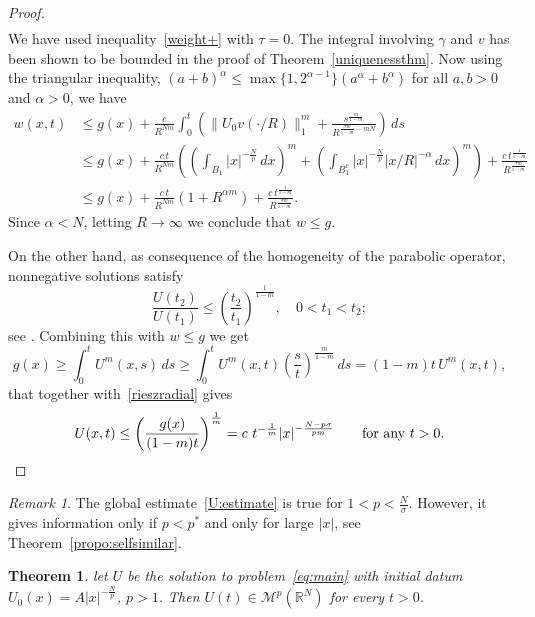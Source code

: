 \documentclass[leqno,12pt]{amsart}
\newtheorem{theorem}{Theorem}[section]
\theoremstyle{definition}
\theoremstyle{remark}
\newtheorem{remark}{Remark}
\numberwithin{equation}{section}
\begin{document}
\begin{proof}
\begin{align*}
\end{align*}
We have used inequality~\eqref{weight+} with $\tau=0$. The integral involving $\gamma$ and $v$ has been shown to be bounded in the proof of Theorem~\ref{uniquenessthm}. Now using the triangular inequality, $(a+b)^\alpha\leq \max\{1,2^{\alpha-1}\}(a^\alpha+b^\alpha)$ for all $a,b>0$ and $\alpha>0$, we have
\begin{align*}
    w(x,t)&\leq g(x) + \frac{c}{R^{Nm}}\int_0^t \left( \|U_0 v(\cdot/R)\|_{1}^{m} + \frac{s^{\tfrac{m}{1-m}}}{R^{\tfrac{\sigma m}{1-m}-mN}}\right) \, ds\\&
    \leq g(x)+\frac{c\,t}{R^{Nm}} \left(\left(\int_{B_1}|x|^{-\frac Np}\,dx\right)^m+\left(\int_{B_1^c}|x|^{-\frac Np}|x/R|^{-\alpha}\,dx\right)^m \right)+ \frac{c\,t^{\tfrac{1}{1-m}}}{R^{\tfrac{\sigma m}{1-m}}}\\&
    \leq g(x)+\frac{c\,t}{R^{Nm}}\left(1+R^{\alpha m}\right)+\frac{c\, t^{\tfrac{1}{1-m}}}{R^{\tfrac{\sigma m}{1-m}}}.
\end{align*}
Since $\alpha<N$, letting $R\to\infty$  we conclude that $w \leq g$. 

On the other hand, as consequence of the homogeneity of the parabolic operator, nonnegative solutions satisfy
$$
    \frac{U(t_2)}{U(t_1)}\leq \left(\frac{t_2}{t_1}\right)^{\frac{1}{1-m}},\quad 0<t_1<t_2; 
$$
see \cite{benilan-crandall}. Combining this with $w\leq g$ we get 
\begin{equation*}
    g(x)\ge \int_{0}^{t}U^m(x,s)\,ds\ge  \int_{0}^{t}U^m(x,t)\left(\frac{s}{t}\right)^{\frac{m}{1-m}}\,ds=(1-m)t\,U^m(x,t),
\end{equation*}
that together with~\eqref{rieszradial} gives
\begin{equation*}
    U(x,t)\le \left(\frac{g(x)}{(1-m)t}\right)^{\frac{1}{m}}=c \ t^{-\frac 1 m}|x|^{-\frac{N-p\sigma}{pm}}\qquad \text{for any $t>0$.}\qedhere
\end{equation*} 
\end{proof}

\begin{remark}
    The global estimate~\eqref{U:estimate} is true for $1<p<\frac N\sigma$. However, it  gives information only if $p<p^*$ and only for large $|x|$, see Theorem~\ref{propo:selfsimilar}.
\end{remark}

\begin{theorem}\label{U in Mp}
   let $U$ be the solution to problem~\eqref{eq:main} with initial datum $U_0(x)=A|x|^{-\frac Np}$, $p>1$. Then $U(t)\in\mathcal{M}^p(\mathbb{R}^N)$ for every $t>0$. 
\end{theorem}
\end{document}
